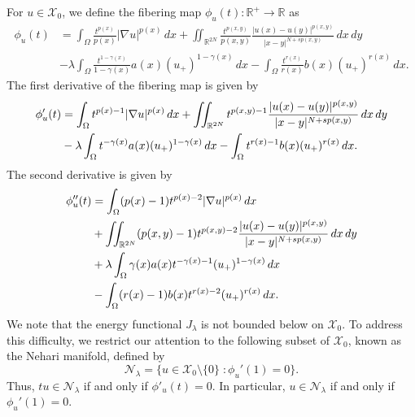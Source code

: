 \documentclass[11pt]{article}
\newcommand{\R}{\mathbb{R}}
\newcommand{\X}{\mathcal{X}_{0}}
\newcommand{\Nh}{\mathcal{N}_\la}
\newcommand{\sm} {\setminus}
\newcommand{\la} {\lambda}
\begin{document}
 For \( u \in \X \), we define the 
 fibering map \( \phi_u(t):\R^+\to \R \) as
\begin{equation}\label{eq:fibering_map}
\begin{aligned}
\phi_u(t) 
&= 
\int_{\Omega} 
\frac{t^{p(x)}}{p(x)} |\nabla u|^{p(x)} \, dx 
+ \iint_{\mathbb{R}^{2N}} 
\frac{t^{p(x,y)}}{p(x,y)} 
\frac{|u(x) - u(y)|^{p(x,y)}}{|x - y|^{N + sp(x,y)}}
 \, dx \, dy \\
& - \lambda 
\int_{\Omega} 
\frac{t^{1 - \gamma(x)}}{1 - \gamma(x)}
 a(x) (u_+)^{1 - \gamma(x)} \, dx 
- 
\int_{\Omega} 
\frac{t^{r(x)}}{r(x)} b(x) (u_+)^{r(x)} \, dx.
\end{aligned}
\end{equation}
The first derivative of the fibering map is given by
\begin{align} \label{eq:fibering_map_first_derivative}
\phi_u'(t) 
& = 
\int_{\Omega} t^{p(x)-1} |\nabla u|^{p(x)} \, dx 
+ \iint_{\mathbb{R}^{2N}} t^{p(x,y)-1} 
\frac{|u(x) - u(y)|^{p(x,y)}}{|x - y|^{N + sp(x,y)}}
 \, dx \, dy  \notag \\
&  - \lambda 
\int_{\Omega} t^{-\gamma(x)} a(x) (u_+)^{1 - \gamma(x)} 
\, dx 
- 
\int_{\Omega} t^{r(x)-1} b(x) (u_+)^{r(x)} \, dx.
\end{align}
The second derivative is given by
\begin{align}\label{eq:fibering_map_second_derivative}
 \phi_u''(t) 
& = 
\int_{\Omega} (p(x) - 1) t^{p(x)-2} |\nabla u|^{p(x)}
 \, dx  \\ \notag
& + \iint_{\mathbb{R}^{2N}} (p(x,y) - 1) t^{p(x,y)-2} 
\frac{|u(x) - u(y)|^{p(x,y)}}{|x - y|^{N + sp(x,y)}} 
\, dx \, dy   \\ \notag
&  + \lambda 
\int_{\Omega} \gamma(x) a(x) 
t^{-\gamma(x)-1} (u_+)^{1 - \gamma(x)} \, dx   \\ \notag
&
- 
\int_{\Omega} (r(x) - 1) b(x) t^{r(x)-2}
 (u_+)^{r(x)} \, dx.
\end{align}
We note that the energy functional 
\( J_{\lambda} \) is not bounded below on 
\( \X \).
To address this difficulty, we restrict our 
attention to the following subset of \( \X \), 
known as the Nehari manifold, defined by
\begin{equation} \label{eq:nehari_manifold}
\mathcal{N}_{\lambda} = 
\Big \{ u \in \X\sm\{0\}
 \;:\phi_u'(1)= 0
 \Big \}.
\end{equation}
Thus, $tu\in \Nh$
if and only if $\phi'_u(t)=0.$
In particular, $u\in \Nh$
if and only if $\phi_u'(1)=0.$
\end{document}
